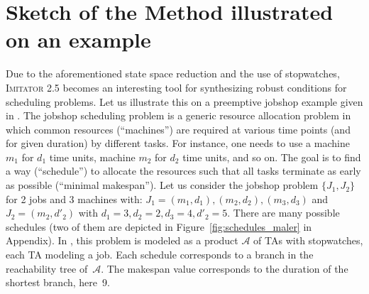 \documentclass{article}
\newcommand{\A}{\mathcal{A}}
\newcommand{\imitator}{\textsc{Imitator}}
\begin{document}
\section{Sketch of the Method illustrated on an example}
\label{sec:sketch}



Due to the aforementioned state space reduction and the use of stopwatches, \imitator{} 2.5 becomes an interesting tool for synthesizing robust conditions 
for scheduling problems.
Let us illustrate this on a preemptive jobshop example given in \cite{AM02}.
The jobshop scheduling problem is a generic resource allocation problem in which common resources (``machines'') are required at various time points (and for given duration) by different tasks.
For instance, one needs to use a machine $m_1$ for $d_1$ time units, machine $m_2$ for $d_2$ time units, and so on.
The goal is to find a way (``schedule'') to allocate the resources such that all tasks terminate as early as possible (``minimal makespan'').
%
Let us consider the jobshop problem $\{J_1, J_2\}$ for 2 jobs and 3 machines  with: $J_1 = (m_1,d_1), (m_2,d_2),(m_3,d_3)$ and $J_2 = (m_2,d'_2)$ with $d_1 = 3, d_2=2, d_3=4, d'_2 = 5$.
There are many possible schedules (two of them are depicted in Figure~\ref{fig:schedules_maler} in Appendix). 
%
In  \cite{AM02}, this problem is modeled as a product $\A$ of TAs with stopwatches, each TA modeling a job.
Each schedule corresponds to a branch in the reachability tree of~$\A$.
The makespan value corresponds to the
duration of the shortest branch, here~9.
% 
\end{document}
